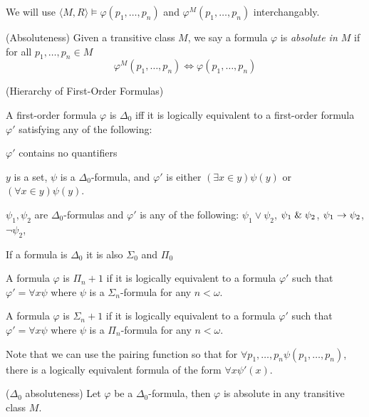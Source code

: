 We will use $\langle M, R \rangle \models \varphi(p_1, \ldots, p_n)$ and $\varphi^M(p_1, \ldots, p_n)$ interchangably.

\begin{definition}{(Absoluteness)}
Given a transitive class $M$, we say a formula $\varphi$ is \emph{absolute in $M$} if for all $p_1, \ldots, p_n \in M$
\begin{equation}
\varphi^M(p_1, \ldots, p_n) \iff \varphi(p_1, \ldots, p_n)
\end{equation}
\end{definition}

\begin{definition}{(Hierarchy of First-Order Formulas)}\\
\bce[(I)]
\item A first-order formula $\varphi$ is $\Delta_0$ iff it is logically equivalent to a first-order formula $\varphi'$ satisfying any of the following:
\bce[(i)]
\item $\varphi'$ contains no quantifiers
\item $y$ is a set, $\psi$ is a $\Delta_0$-formula, and $\varphi'$ is either $(\exists x \in y)\psi(y)$ or $(\forall x \in y)\psi(y)$.
\item $\psi_1, \psi_2$ are $\Delta_0$-formulas and $\varphi'$ is any of the following: $\psi_1 \lor \psi_2$, $\psi_1 \mathrel{\&} \psi_2$, $\psi_1 \rightarrow \psi_2$, $\neg \psi_2$, 
\ece
\item If a formula is $\Delta_0$ it is also $\Sigma_0$ and $\Pi_0$
\item A formula $\varphi$ is $\Pi_n+1$ if it is logically equivalent to a formula $\varphi'$ such that $\varphi' = \forall x \psi$ where $\psi$ is a $\Sigma_n$-formula for any $n < \omega$.
\item A formula $\varphi$ is $\Sigma_n+1$ if it is logically equivalent to a formula $\varphi'$ such that $\varphi' = \forall x \psi$ where $\psi$ is a $\Pi_n$-formula for any $n < \omega$.
\ece
\end{definition} %
Note that we can use the pairing function so that for $\forall p_1, \ldots, p_n \psi(p_1, \ldots, p_n)$, there is a logically equivalent formula of the form $\forall x \psi'(x)$.

\begin{lemma}{($\Delta_0$ absoluteness)}\label{lemma:delta_0_absoluteness}
Let $\varphi$ be a $\Delta_0$-formula, then $\varphi$ is absolute in any transitive class $M$.
\end{lemma}

